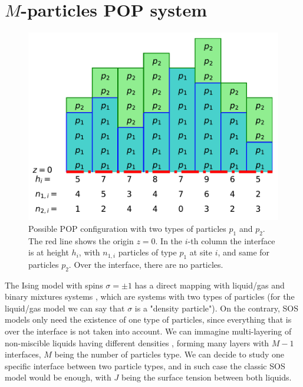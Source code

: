     \section{$M$-particles POP system}

\begin{figure}
    \centering
    \includegraphics[width=0.7\linewidth]{pop/figure-pop.pdf}
    \caption{Possible POP configuration with two types of particles $p_1$ and $p_2$. The red line shows the origin $z=0$. In the $i$-th column the interface is at height $h_i$, with $n_{1,i}$ particles of type $p_1$ at site $i$, and same for particles $p_2$. Over the interface, there are no particles. }
    \label{fig-pop}
\end{figure}

The Ising model with spins $\sigma= \pm1$ has a direct mapping with liquid/gas and binary mixtures systems \cite{goldenfeld_lectures_2018}, which are systems with two types of particles (for the liquid/gas model we can say that $\sigma$ is a "density particle"). On the contrary, SOS models only need the existence of one type of particles, since everything that is over the interface is not taken into account. We can immagine multi-layering of non-miscible liquids having different densities \cite{wang_instability_1978,bonizzi_simulation_2003}, forming many layers with $M-1$ interfaces, $M$ being the number of particles type. We can decide to study one specific interface between two particle types, and in such case the classic SOS model would be enough, with $J$ being the surface tension between both liquids. 

